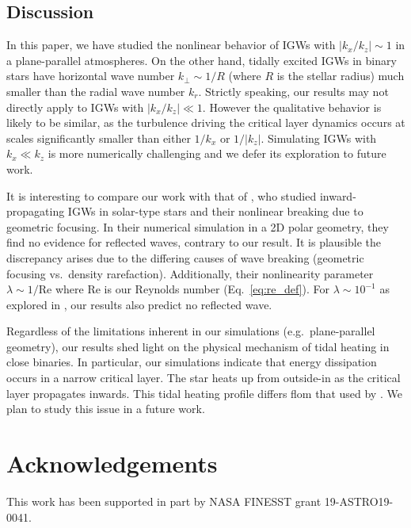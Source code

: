 \documentclass[
        fleqn,
        usenatbib,
        referee,
    ]{mnras}
\newcommand*{\abs}[1]{\left|#1\right|}
\begin{document}
\subsection{Discussion}

In this paper, we have studied the nonlinear behavior of IGWs with $\abs{k_x /
k_z} \sim 1$ in a plane-parallel atmospheres. On the other hand, tidally
excited IGWs in binary stars have horizontal wave number $k_\perp \sim 1/R$
(where $R$ is the stellar radius) much smaller than the radial wave number
$k_r$. Strictly speaking, our results may not directly apply to IGWs with
$\abs{k_x/k_z}\ll 1$. However the qualitative behavior is likely to be similar,
as the turbulence driving the critical layer dynamics occurs at scales
significantly smaller than either $1/k_x$ or $1/\abs{k_z}$. Simulating IGWs with
$k_x \ll k_z$ is more numerically challenging and we defer its exploration to
future work.

It is interesting to compare our work with that of \citet{barker_ogilvie}, who
studied inward-propagating IGWs in solar-type stars and their nonlinear breaking
due to geometric focusing. In their numerical simulation in a 2D polar geometry,
they find no evidence for reflected waves, contrary to our result. It is
plausible the discrepancy arises due to the differing causes of wave breaking
(geometric focusing vs.\ density rarefaction). Additionally, their nonlinearity
parameter $\lambda \sim 1/\mathrm{Re}$ where $\mathrm{Re}$ is our Reynolds
number (Eq.~\eqref{eq:re_def}). For $\lambda \sim 10^{-1}$ as explored in
\citet{barker_ogilvie}, our results also predict no reflected wave.

Regardless of the limitations inherent in our simulations (e.g.\ plane-parallel
geometry), our results shed light on the physical mechanism of tidal heating in
close binaries. In particular, our simulations indicate that energy dissipation
occurs in a narrow critical layer. The star heats up from outside-in as the
critical layer propagates inwards. This tidal heating profile differs flom that
used by \citet{tidal_novae}. We plan to study this issue in a future work.

\section{Acknowledgements}\label{s:ack}

This work has been supported in part by NASA FINESST grant
19-ASTRO19-0041.%



\end{document}
